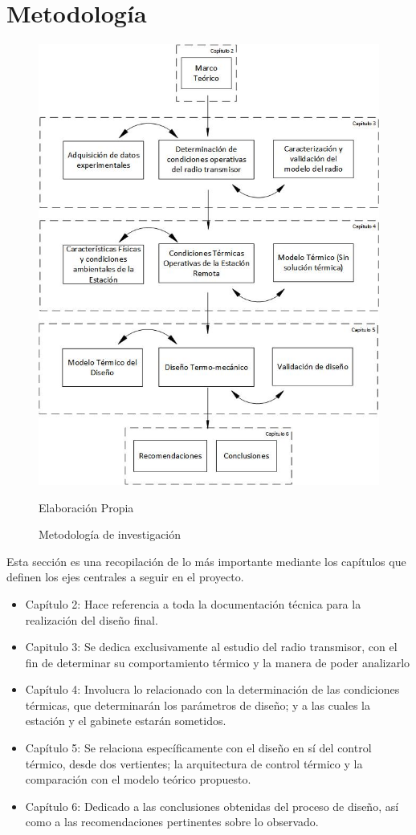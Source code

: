 \section{Metodología}
\begin{figure}[h]
\centering
\includegraphics[width=0.9\linewidth]{Figuras/Metodologia.jpg}
\caption{Metodología de investigación}
Elaboración Propia
\label{Metodologia}
\end{figure}

Esta sección es una recopilación de lo más importante mediante los capítulos que definen los ejes centrales a seguir en el proyecto.

\begin{itemize}
    \item Capítulo 2: Hace referencia a toda la documentación técnica para la realización del diseño final.
    \item Capitulo 3: Se dedica exclusivamente al estudio del radio transmisor, con el fin de determinar su comportamiento térmico y la manera de poder analizarlo
    \item Capítulo 4: Involucra lo relacionado con la determinación de las condiciones térmicas, que determinarán los parámetros de diseño; y a las cuales la estación y el gabinete estarán sometidos.
    \item Capítulo 5: Se relaciona específicamente con el diseño en sí del control térmico, desde dos vertientes; la arquitectura de control térmico y la comparación con el modelo teórico propuesto.
    \item Capítulo 6: Dedicado a las conclusiones obtenidas del proceso de diseño, así como a las recomendaciones pertinentes sobre lo observado.
\end{itemize}

